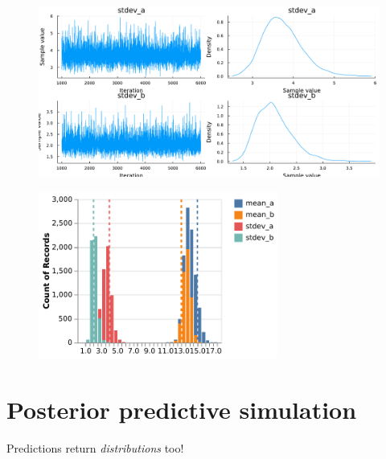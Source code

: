 \documentclass[aspectratio=169,xcolor=svgnames]{beamer}
\begin{document}
\begin{frame}
  \begin{figure}[ht]
    \centering
    \includegraphics[height=0.7\textheight]{figures/chain_stdev.pdf}
  \end{figure}
\end{frame}

\begin{frame}
  \begin{figure}[ht]
    \centering
    \includegraphics[width=0.7\textwidth]{figures/plot_a_b_parameters.pdf}
  \end{figure}

\end{frame}

\section{Posterior predictive simulation}

\begin{frame}
  \huge
  \center
  Predictions return \emph{distributions} too!
\end{frame}
\end{document}
